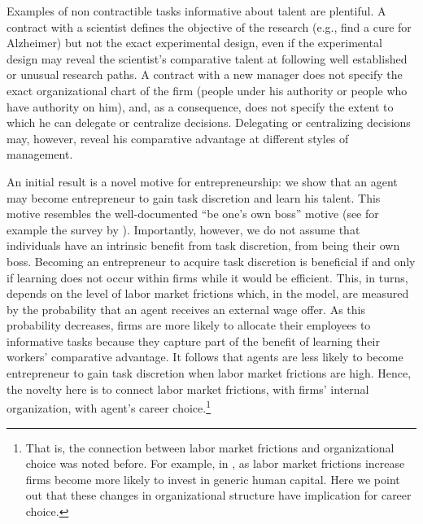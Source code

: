 \documentclass[12pt,american]{paper}
\theoremstyle{remark}
\begin{document}
Examples of non contractible tasks informative about talent are plentiful. A contract with a scientist defines the objective of the research (e.g., find a cure for Alzheimer) but not the exact experimental design, even if the experimental design may reveal the scientist's comparative talent at following well established or unusual research paths. A contract with a new manager does not specify the exact organizational chart of the firm (people under his authority or people who have authority on him), and, as a consequence, does not specify the extent to which he can delegate or centralize decisions. Delegating or centralizing decisions may, however, reveal his comparative advantage at different styles of management.

An initial result is a novel motive for entrepreneurship: we show that an agent may become entrepreneur to gain task discretion and learn his talent. This motive resembles the  well-documented ``be one's own boss'' motive  (see for example the survey by \citealp{stephan2015understanding}). Importantly, however, we do not assume that individuals have an intrinsic benefit from task discretion, from being their own boss. Becoming an entrepreneur to acquire task discretion is beneficial if and only if learning does not occur within firms while it would be efficient. This, in turns, depends on the level of labor market frictions which, in the model, are measured by the  probability that an agent receives an external wage offer. As this probability decreases, firms are more likely to allocate their  employees to informative tasks because they capture part of the benefit of learning their workers' comparative advantage. It follows that agents are less likely to become entrepreneur to gain task discretion when labor market frictions are high. Hence, the novelty here is to connect labor market frictions, with firms' internal organization, with agent's career choice.\footnote{That is, the connection between labor market frictions and organizational choice was noted before. For example, in \cite{acemoglu1999structure}, as labor market frictions increase firms become more likely to invest in generic human capital. Here we point out that these changes in organizational structure have implication for career choice.}
\end{document}
